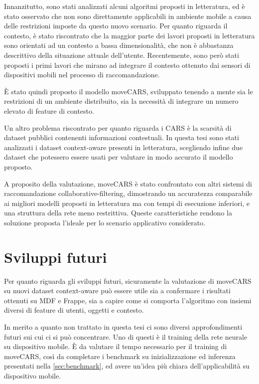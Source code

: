 \documentclass[12pt,italian]{report}
\begin{document}
Innanzitutto, sono stati analizzati alcuni algoritmi proposti in letteratura, ed è stato osservato che non sono direttamente applicabili in ambiente mobile a causa delle  restrizioni imposte da questo nuovo scenario. Per quanto riguarda il contesto, è stato riscontrato che la maggior parte dei lavori proposti in letteratura sono orientati ad un contesto a bassa dimensionalità, che non è abbastanza descrittivo della situazione attuale dell'utente. Recentemente, sono però stati proposti i primi lavori che mirano ad integrare il contesto ottenuto dai sensori di dispositivi mobili nel processo di raccomandazione. 

\`E stato quindi proposto il modello moveCARS, sviluppato tenendo a mente sia le restrizioni di un ambiente distribuito, sia la necessità di integrare un numero elevato di feature di contesto.

Un altro problema riscontrato per quanto riguarda i CARS è la scarsità di dataset pubblici contenenti informazioni contestuali. In questa tesi sono stati analizzati i dataset context-aware presenti in letteratura, scegliendo infine due dataset che potessero essere usati per valutare in modo accurato il modello proposto.

A proposito della valutazione, moveCARS è stato confrontato con altri sistemi di raccomandazione collaborative-filtering, dimostrando un accuratezza comparabile ai migliori modelli proposti in letteratura ma con tempi di esecuzione inferiori,  e una struttura della rete meno restrittiva. Queste caratteristiche rendono la soluzione proposta l'ideale per lo scenario applicativo considerato.

\section{Sviluppi futuri}
Per quanto riguarda gli sviluppi futuri, sicuramente la valutazione di moveCARS su nuovi dataset context-aware può essere utile sia a confermare i risultati ottenuti su MDF e Frappe, sia a capire come si comporta l'algoritmo con insiemi diversi di feature di utenti, oggetti e contesto.

In merito a quanto non trattato in questa tesi ci sono diversi approfondimenti futuri sui cui ci si può concentrare. Uno di questi è il training della rete neurale su dispositivo mobile.
\`E da valutare il tempo necessario per il training di moveCARS, così da completare i benchmark su inizializzazione ed inferenza presentati nella \autoref{sec:benchmark}, ed avere un'idea più chiara dell'applicabilità su dispositivo mobile.
\end{document}
